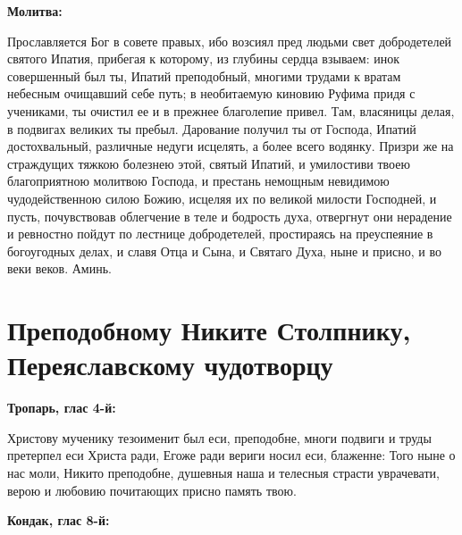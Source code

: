 \bfseries Молитва:\normalfont{}\nopagebreak


Прославляется Бог в совете правых, ибо возсиял пред людьми свет добродетелей святого Ипатия, прибегая к которому, из глубины сердца взываем: инок совершенный был ты, Ипатий преподобный, многими трудами к вратам небесным очищавший себе путь; в необитаемую киновию Руфима придя с учениками, ты очистил ее и в прежнее благолепие привел. Там, власяницы делая, в подвигах великих ты пребыл. Дарование получил ты от Господа, Ипатий достохвальный, различные недуги исцелять, а более всего водянку. Призри же на страждущих тяжкою болезнею этой, святый Ипатий, и умилостиви твоею благоприятною молитвою Господа, и престань немощным невидимою чудодейственною силою Божию, исцеляя их по великой милости Господней, и пусть, почувствовав облегчение в теле и бодрость духа, отвергнут они нерадение и ревностно пойдут по лестнице добродетелей, простираясь на преуспеяние в богоугодных делах, и славя Отца и Сына, и Святаго Духа, ныне и присно, и во веки веков. Аминь.
\nopagebreak\bigskip\bigskip\mychapterending


 

\section{Преподобному Никите Столпнику, Переяславскому чудотворцу}
 


\bfseries Тропарь, глас 4-й:\normalfont{}\nopagebreak


Христову мученику тезоименит был еси, преподобне, многи подвиги и труды претерпел еси Христа ради, Егоже ради вериги носил еси, блаженне: Того ныне о нас моли, Никито преподобне, душевныя наша и телесныя страсти уврачевати, верою и любовию почитающих присно память твою.


\medskip


\bfseries Кондак, глас 8-й:\normalfont{}\nopagebreak


